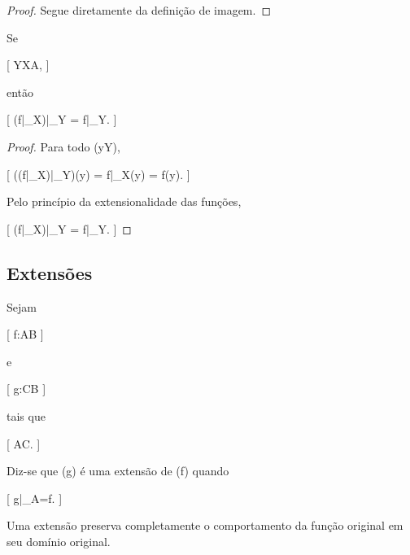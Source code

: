 \begin{proof}

	Segue diretamente da definição de imagem.

\end{proof}

\begin{prop}
	\label{prop:matematica:funcoes:restricoes-e-extensoes:restricoes-sucessivas}

	Se

		[
			Y\subseteq X\subseteq A,
		]

	então

	[
	(f|_X)|_Y
	=
	f|_Y.
	]

\end{prop}

\begin{proof}

	Para todo (y\in Y),

	[
			((f|_X)|_Y)(y)
			=
			f|_X(y)
			=
			f(y).
		]

	Pelo princípio da extensionalidade das funções,

	[
			(f|_X)|_Y
			=
			f|_Y.
		]

\end{proof}

\subsection{Extensões}

\begin{defn}
	\label{def:matematica:funcoes:restricoes-e-extensoes:extensao}

	Sejam

		[
			f:A\to B
		]

	e

		[
			g:C\to B
		]

	tais que

		[
			A\subseteq C.
		]

	Diz-se que (g) é uma extensão de (f) quando

		[
			g|_A=f.
		]

\end{defn}

\begin{obs}

	Uma extensão preserva completamente o comportamento da função
	original em seu domínio original.

\end{obs}


